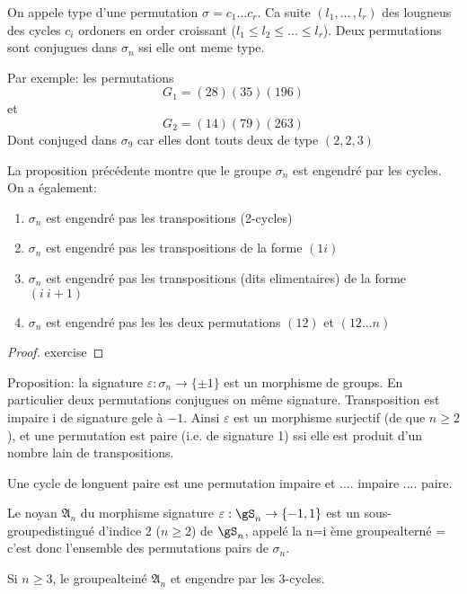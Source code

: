 \begin{proposition}
	On appele type d'une permutation $\sigma=c_1... c_r$. Ca suite $(l_1,...\,,l_r)$ des lougneus des cycles $c_i$ ordoners en order croissant ($l_1\leq l_2\leq ... \leq l_r$).
	Deux permutations sont conjugues dans $\sigma_n$ ssi elle ont meme type.
\end{proposition}

Par exemple: les permutations
$$G_1=(28)(35)(196)$$
et
$$G_2=(14)(79)(263)$$
Dont conjuged dans $\sigma_9$ car elles dont touts deux de type $(2,2,3)$


La proposition précédente montre que le groupe $\sigma_n$ est engendré par les cycles. On a également:

\begin{theorem}
	\begin{enumerate}
		\item $\sigma_n$ est engendré pas les transpositions (2-cycles)
		\item $\sigma_n$ est engendré pas les transpositions de la forme $(1 i)$
		\item $\sigma_n$ est engendré pas les transpositions (dits elimentaires) de la forme $(i\ i+1)$
		\item $\sigma_n$ est engendré pas les les deux permutations $(12)$ et $(12...n)$
	\end{enumerate}
	
\end{theorem}
\begin{proof}
	exercise
\end{proof}

Proposition: la signature $\varepsilon : \sigma_n\rightarrow\{\pm 1\}$ est un morphisme de groups. En particulier deux permutations conjugues on même signature.
Transposition est impaire i de signature gele à $-1$.
Ainsi $\varepsilon$ est un morphisme surjectif (de que $n\geq 2$), et une permutation est paire (i.e. de signature 1) ssi elle est produit d'un nombre lain de transpositions.

Une cycle de longuent paire est une permutation impaire et .... impaire .... paire.

Le noyan $\mathfrak{A}_n$ du morphisme signature $\varepsilon:\gS_n\rightarrow\{-1, 1\}$ est un sous-groupedistingué d'indice 2 ($n\geq2$) de $\gS_n$, appelé la n=i ème groupealterné = c'est donc l'ensemble des permutations pairs de $\sigma_n$.

\begin{proposition}
	Si $n\geq 3$, le groupealteiné $\mathfrak{A}_n$ et engendre par les 3-cycles.
\end{proposition}

